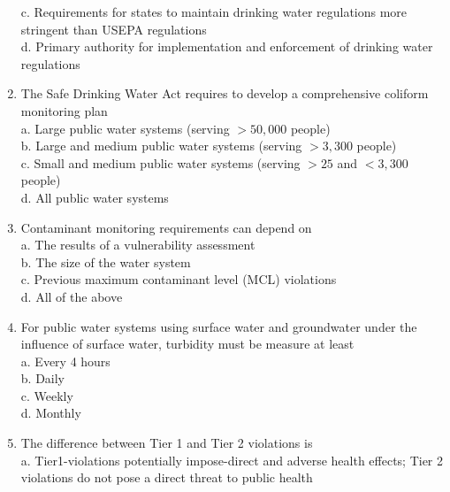 \begin{enumerate}
c. Requirements for states to maintain drinking water regulations more stringent than USEPA regulations \\
d. Primary authority for implementation and enforcement of drinking water regulations


\item The Safe Drinking Water Act requires to develop a comprehensive coliform monitoring plan\\
a. Large public water systems (serving $>50,000$ people)\\
b. Large and medium public water systems (serving $>3,300$ people)\\
c. Small and medium public water systems (serving $>25$ and $<3,300$ people)\\
d. All public water systems\\

\item Contaminant monitoring requirements can depend on\\

a. The results of a vulnerability assessment\\

b. The size of the water system\\

c. Previous maximum contaminant level (MCL) violations\\

d.  All of the above\\

\item For public water systems using surface water and groundwater under the influence of surface water, turbidity must be measure at least\\

a. Every 4 hours\\

b. Daily\\

c. Weekly\\

d. Monthly\\

\item The difference between Tier 1 and Tier 2 violations is\\

a. Tier1-violations potentially impose-direct and adverse health effects; Tier 2 violations do not pose a direct threat to public health\\


\end{enumerate}
